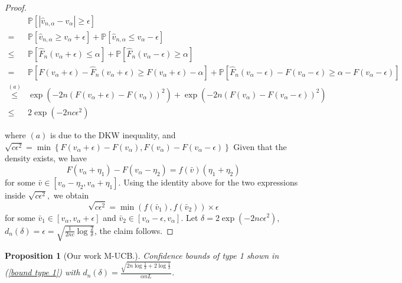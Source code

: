 \documentclass{article}
\theoremstyle{plain}
\newtheorem{prop}{Proposition}
\begin{document}
\begin{proof}
\begin{align}
&  \mathbb{P}\left[\left|\hat{v}_{n, \alpha}-v_{\alpha}\right|\geq \epsilon\right]\\
=&\mathbb{P}\left[\hat{v}_{n, \alpha} \geq v_{\alpha}+\epsilon\right]+\mathbb{P}\left[\hat{v}_{n, \alpha} \leq v_{\alpha}-\epsilon\right] \\
\leq& \mathbb{P}\left[\hat{F}_{n}\left(v_{\alpha}+\epsilon\right) \leq \alpha\right]+\mathbb{P}\left[\hat{F}_{n}\left(v_{\alpha}-\epsilon\right) \geq \alpha\right] \\
=&\mathbb{P}\left[F\left(v_{\alpha}+\epsilon\right)-\hat{F}_{n}\left(v_{\alpha}+\epsilon\right) \geq F\left(v_{\alpha}+\epsilon\right)-\alpha\right]+\mathbb{P}\left[\hat{F}_{n}\left(v_{\alpha}-\epsilon\right)-F\left(v_{\alpha}-\epsilon\right) \geq \alpha-F\left(v_{\alpha}-\epsilon\right)\right] \\
\stackrel{(a)}{\leq}& \exp \left(-2 n\left(F\left(v_{\alpha}+\epsilon\right)-F\left(v_{\alpha}\right)\right)^{2}\right)+\exp \left(-2 n\left(F\left(v_{\alpha}\right)-F\left(v_{\alpha}-\epsilon\right)\right)^{2}\right) \\
\leq& 2 \exp \left(-2 n c \epsilon^{2}\right)
\end{align}

where $(a)$ is due to the DKW inequality, and $ \sqrt{c \epsilon^2} =\min \left\{F\left(v_{\alpha}+\epsilon\right)-F\left(v_{\alpha}\right), F\left(v_{\alpha}\right)-F\left(v_{\alpha}-\epsilon\right)\right\}$
Given that the density exists, we have
$$
F\left(v_{\alpha}+\eta_{1}\right)-F\left(v_{\alpha}-\eta_{2}\right)=f(\bar{v})\left(\eta_{1}+\eta_{2}\right)
$$
for some $\bar{v} \in\left[v_{\alpha}-\eta_{2}, v_{\alpha}+\eta_{1}\right] .$ Using the identity above for the two expressions inside $\sqrt{c \epsilon^2},$ we obtain
$$
\sqrt{c \epsilon^2} = \min \left(f\left(\bar{v}_{1}\right), f\left(\bar{v}_{2}\right)\right) \times \epsilon
$$
for some $\bar{v}_{1} \in\left[v_{\alpha}, v_{\alpha}+\epsilon\right]$ and $\bar{v}_{2} \in\left[v_{\alpha}-\epsilon, v_{\alpha}\right] .$ 
Let $\delta = 2 \exp \left(-2 n c \epsilon^{2}\right)$, $d_n(\delta) = \epsilon = \sqrt{\frac{1}{2nc} \log \frac{2}{\delta}}$, the claim follows.
\end{proof}

\begin{prop}[Our work M-UCB.]
Confidence bounds of type 1 shown in (\ref{bound type 1}) with $d_n(\delta) = \frac{\sqrt{2n\log \frac{1}{\delta} + 2 \log \frac{1}{\delta}}}{\alpha n L}$.

\end{prop}
\end{document}
